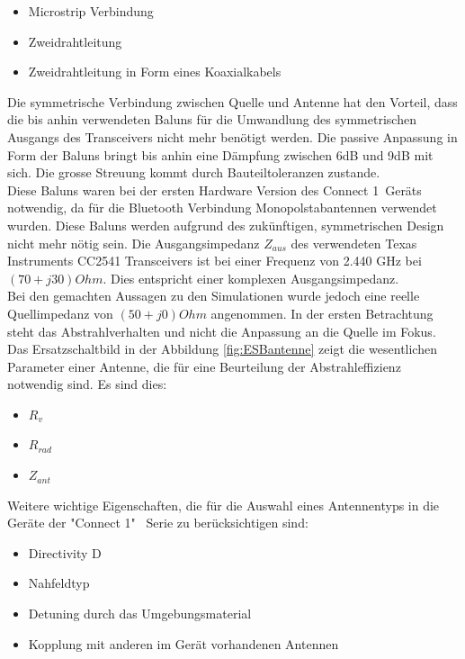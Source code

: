 \begin{itemize}
\item Microstrip Verbindung  
\item Zweidrahtleitung
\item Zweidrahtleitung in Form eines Koaxialkabels
\end{itemize}
Die symmetrische Verbindung zwischen Quelle und Antenne hat den Vorteil, dass die bis anhin verwendeten Baluns für die Umwandlung des symmetrischen Ausgangs des Transceivers nicht mehr benötigt werden. Die passive Anpassung in Form der Baluns bringt bis anhin eine Dämpfung zwischen 6dB und 9dB mit sich. Die grosse Streuung kommt durch Bauteiltoleranzen zustande.\\
Diese Baluns waren bei der ersten Hardware Version des \glqq Connect 1\grqq \ Geräts notwendig, da für die Bluetooth Verbindung Monopolstabantennen verwendet wurden. Diese Baluns werden aufgrund des zukünftigen, symmetrischen Design nicht mehr nötig sein. Die Ausgangsimpedanz $Z_{aus}$ des verwendeten Texas Instruments CC2541 Transceivers ist bei einer Frequenz von 2.440 GHz bei $(70+j30) Ohm$. Dies entspricht einer komplexen Ausgangsimpedanz. \\Bei den gemachten Aussagen zu den Simulationen wurde jedoch eine  reelle Quellimpedanz von $(50+j0) Ohm$ angenommen. In der ersten Betrachtung steht das Abstrahlverhalten und nicht die Anpassung  an die Quelle im Fokus. \\
Das Ersatzschaltbild in der Abbildung \ref{fig:ESBantenne} zeigt die wesentlichen Parameter einer Antenne, die für eine Beurteilung der Abstrahleffizienz notwendig sind. Es sind dies:
\begin{itemize}
\item $R_{v}$
\item $R_{rad}$
\item $Z_{ant}$
\end{itemize}

Weitere wichtige Eigenschaften, die für die Auswahl eines Antennentyps in die Geräte der "Connect 1" \  Serie zu berücksichtigen  sind:
\begin{itemize}
\item Directivity D
\item Nahfeldtyp
\item Detuning durch das Umgebungsmaterial
\item Kopplung mit anderen im Gerät vorhandenen Antennen
\end{itemize}


